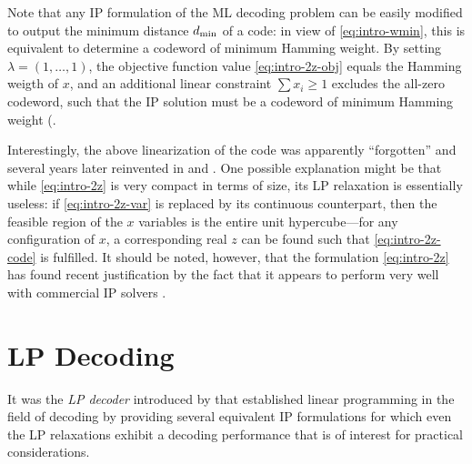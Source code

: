 Note that any IP formulation of the ML decoding problem can be easily modified to output the minimum distance $d_\mathrm{min}$ of a code: in view of \cref{eq:intro-wmin}, this is equivalent to determine a codeword of minimum Hamming weight. By setting $λ=(1,\dotsc,1)$, the objective function value \cref{eq:intro-2z-obj} equals the Hamming weigth of $x$, and an additional linear constraint $\sum x_i ≥ 1$ excludes the all-zero codeword, such that the IP solution must be a codeword of minimum Hamming weight (\cite{Punekar+10MinDistance,KehaDuman10MinDistBranchCut}.

Interestingly, the above linearization of the code was apparently \enquote{forgotten} and several years later reinvented in \citeyear{Tanatmis+09ValidInequalities} \cite{Tanatmis+09ValidInequalities} and \citeyear{KehaDuman10MinDistBranchCut} \cite{KehaDuman10MinDistBranchCut}. One possible explanation might be that while \cref{eq:intro-2z} is very compact in terms of size, its LP relaxation is essentially useless: if \cref{eq:intro-2z-var} is replaced by its continuous counterpart, then the feasible region of the $x$ variables is the entire unit hypercube—for any configuration of $x$, a corresponding real $z$ can be found such that \cref{eq:intro-2z-code} is fulfilled. It should be noted, however, that the formulation \cref{eq:intro-2z} has found recent justification by the fact that it appears to perform very well with commercial IP solvers \cite{Tanatmis+10NumericalComparison,Punekar+10MinDistance}.


\section{LP Decoding}\label{sec:intro-lp-decoding}
It was the \emph{LP decoder} introduced by \citeauthor{Feldman03PhD} \cite{Feldman03PhD,Feldman+05LPDecoding} that established linear programming in the field of decoding by providing several equivalent IP formulations for which even the LP relaxations exhibit a decoding performance that is of interest for practical considerations.

